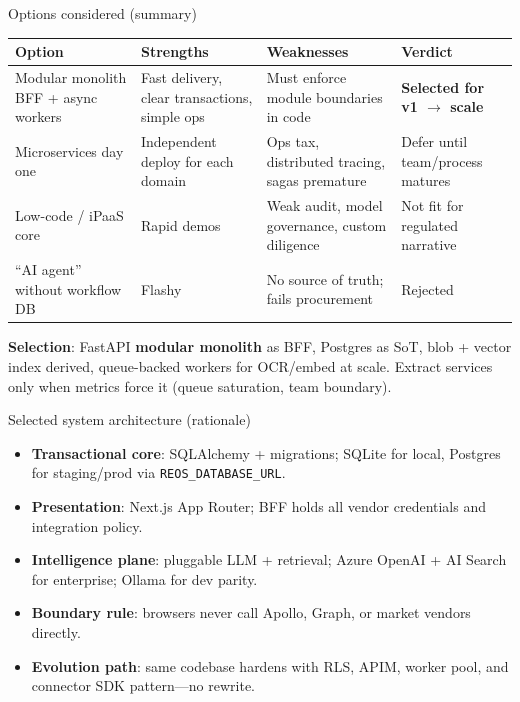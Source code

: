 \documentclass[aspectratio=169,11pt]{beamer}
\begin{document}
\begin{frame}{Options considered (summary)}
  \tiny
  \begin{tabular}{p{2.4cm}p{4.3cm}p{4.3cm}p{3.4cm}}
    \textbf{Option} & \textbf{Strengths} & \textbf{Weaknesses} & \textbf{Verdict} \\
    \hline
    Modular monolith BFF + async workers & Fast delivery, clear transactions, simple ops & Must enforce module boundaries in code & \textbf{Selected for v1 $\rightarrow$ scale} \\
    Microservices day one & Independent deploy for each domain & Ops tax, distributed tracing, sagas premature & Defer until team/process matures \\
    Low-code / iPaaS core & Rapid demos & Weak audit, model governance, custom diligence & Not fit for regulated narrative \\
    ``AI agent'' without workflow DB & Flashy & No source of truth; fails procurement & Rejected \\
  \end{tabular}

  \vspace{0.4em}
  \normalsize
  \textbf{Selection}: FastAPI \textbf{modular monolith} as BFF, Postgres as SoT, blob + vector index derived, queue-backed workers for OCR/embed at scale. Extract services only when metrics force it (queue saturation, team boundary).
\end{frame}

\begin{frame}{Selected system architecture (rationale)}
  \small
  \begin{itemize}\itemsep3pt
    \item \textbf{Transactional core}: SQLAlchemy + migrations; SQLite for local, Postgres for staging/prod via \texttt{REOS\_DATABASE\_URL}.
    \item \textbf{Presentation}: Next.js App Router; BFF holds all vendor credentials and integration policy.
    \item \textbf{Intelligence plane}: pluggable LLM + retrieval; Azure OpenAI + AI Search for enterprise; Ollama for dev parity.
    \item \textbf{Boundary rule}: browsers never call Apollo, Graph, or market vendors directly.
    \item \textbf{Evolution path}: same codebase hardens with RLS, APIM, worker pool, and connector SDK pattern---no rewrite.
  \end{itemize}
\end{frame}
\end{document}
